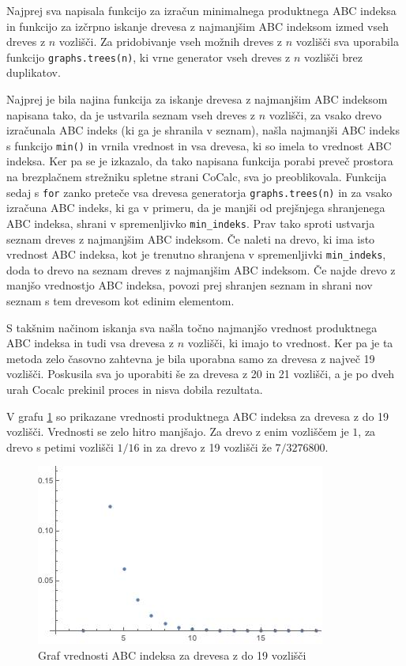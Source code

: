 \documentclass[a4paper,12 pt]{article}
\begin{document}
Najprej sva napisala funkcijo za izračun minimalnega produktnega ABC indeksa in funkcijo za izčrpno iskanje drevesa z najmanjšim ABC indeksom izmed vseh dreves z $n$ vozlišči. Za pridobivanje vseh možnih dreves z $n$ vozlišči sva uporabila funkcijo \texttt{graphs.trees(n)}, ki vrne generator vseh dreves z $n$ vozlišči brez duplikatov.

Najprej je bila najina funkcija za iskanje drevesa z najmanjšim ABC indeksom napisana tako, da je ustvarila seznam vseh dreves z $n$ vozlišči, za vsako drevo izračunala ABC indeks (ki ga je shranila v seznam), našla najmanjši ABC indeks s funkcijo \texttt{min()} in vrnila vrednost in vsa drevesa, ki so imela to vrednost ABC indeksa. Ker pa se je izkazalo, da tako napisana funkcija porabi preveč prostora na brezplačnem strežniku spletne strani CoCalc, sva jo preoblikovala. Funkcija sedaj s \texttt{for} zanko preteče vsa drevesa generatorja \texttt{graphs.trees(n)} in za vsako izračuna ABC indeks, ki ga v primeru, da je manjši od prejšnjega shranjenega ABC indeksa, shrani v spremenljivko \texttt{min\_indeks}. Prav tako sproti ustvarja seznam dreves z najmanjšim ABC indeksom. Če naleti na drevo, ki ima isto vrednost ABC indeksa, kot je trenutno shranjena v spremenljivki \texttt{min\_indeks}, doda to drevo na seznam dreves z najmanjšim ABC indeksom. Če najde drevo z manjšo vrednostjo ABC indeksa, povozi prej shranjen seznam in shrani nov seznam s tem drevesom kot edinim elementom.

S takšnim načinom iskanja sva našla točno najmanjšo vrednost produktnega ABC indeksa in tudi vsa drevesa z $n$ vozlišči, ki imajo to vrednost. Ker pa je ta metoda zelo časovno zahtevna je bila uporabna samo za drevesa z največ 19 vozlišči. Poskusila sva jo uporabiti še za drevesa z 20 in 21 vozlišči, a je po dveh urah Cocalc prekinil proces in nisva dobila rezultata.

V grafu \ref{fig:ABC} so prikazane vrednosti produktnega ABC indeksa za drevesa z do 19 vozlišči. Vrednosti se zelo hitro manjšajo. Za drevo z enim vozliščem je $1$, za drevo s petimi vozlišči $1/16$ in za drevo z 19 vozlišči že $7/3276800$.
\begin{figure}
  \includegraphics[width=\linewidth]{graf_indeksov_do_19.jpg}
  \caption{Graf vrednosti ABC indeksa za drevesa z do 19 vozlišči}
  \label{fig:ABC}
\end{figure}
\end{document}
